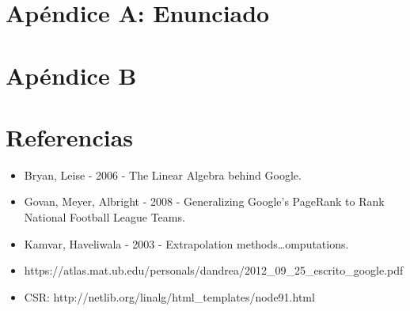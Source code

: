 \section{Apéndice A: Enunciado}


\section{Apéndice B}

\section{Referencias}

\begin{itemize}
\item Bryan, Leise - 2006 - The Linear Algebra behind Google.
\item  Govan, Meyer, Albright - 2008 - Generalizing Google’s PageRank to Rank National Football League Teams.
\item Kamvar, Haveliwala - 2003 - Extrapolation methods…omputations.
\item https://atlas.mat.ub.edu/personals/dandrea/2012_09_25_escrito_google.pdf
\item CSR: http://netlib.org/linalg/html_templates/node91.html
\end{itemize}